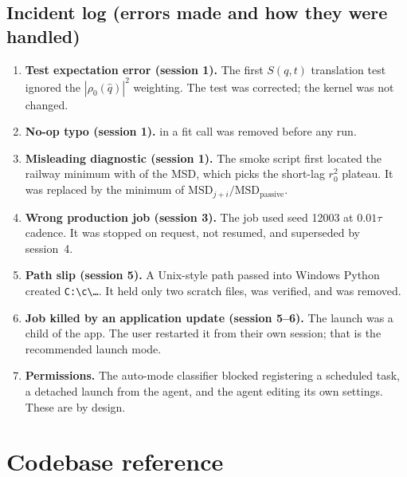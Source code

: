 \subsection{Incident log (errors made and how they were handled)}
\begin{enumerate}
\item \textbf{Test expectation error (session 1).} The first $S(q,t)$ translation test ignored the $|\rho_0(\hat q)|^2$ weighting. The test was corrected; the kernel was not changed.
\item \textbf{No-op typo (session 1).}  in a fit call was removed before any run.
\item \textbf{Misleading diagnostic (session 1).} The smoke script first located the railway minimum with  of the MSD, which picks the short-lag $r_0^2$ plateau. It was replaced by the minimum of $\mathrm{MSD}_{j+i}/\mathrm{MSD}_\mathrm{passive}$.
\item \textbf{Wrong production job (session 3).} The job used seed 12003 at $0.01\tau$ cadence. It was stopped on request, not resumed, and superseded by session~4.
\item \textbf{Path slip (session 5).} A Unix-style path passed into Windows Python created \texttt{C:\textbackslash c\textbackslash\ldots}. It held only two scratch files, was verified, and was removed.
\item \textbf{Job killed by an application update (session 5--6).} The launch was a child of the app. The user restarted it from their own session; that is the recommended launch mode.
\item \textbf{Permissions.} The auto-mode classifier blocked registering a scheduled task, a detached launch from the agent, and the agent editing its own settings. These are by design.
\end{enumerate}

\section{Codebase reference}\label{sec:code}
